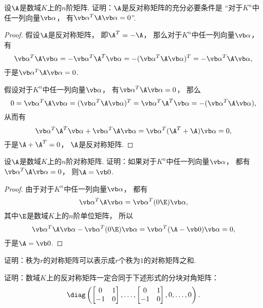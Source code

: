 \begin{example}\label{example:二次型.反对称矩阵对应的二次型恒为零}
设\(\A\)是数域\(K\)上的\(n\)阶矩阵.
证明：\(\A\)是反对称矩阵的充分必要条件是
“对于\(K^n\)中任一列向量\(\vb\alpha\)，
有\(\vb\alpha^T \A \vb\alpha = 0\)”.
\begin{proof}
假设\(\A\)是反对称矩阵，
即\(\A^T = -\A\)，
那么对于\(K^n\)中任一列向量\(\vb\alpha\)，
有\[
	\vb\alpha^T \A \vb\alpha
	= - \vb\alpha^T \A^T \vb\alpha
	= - (\vb\alpha^T \A \vb\alpha)^T
	= - \vb\alpha^T \A \vb\alpha, %
\]
于是\(\vb\alpha^T \A \vb\alpha = 0\).

假设对于\(K^n\)中任一列向量\(\vb\alpha\)，
有\(\vb\alpha^T \A \vb\alpha = 0\)，
那么\[
	0 = \vb\alpha^T \A \vb\alpha
	= (\vb\alpha^T \A \vb\alpha)^T
	= \vb\alpha^T \A^T \vb\alpha
	= - (\vb\alpha^T \A \vb\alpha),
\]
从而有\[
	\vb\alpha^T \A^T \vb\alpha
	+ \vb\alpha^T \A \vb\alpha
	= \vb\alpha^T (\A^T + \A) \vb\alpha
	= 0,
\]
于是\(\A + \A^T = 0\)，
\(\A\)是反对称矩阵.
\end{proof}
\end{example}
\begin{example}
设\(\A\)是数域\(K\)上的\(n\)阶对称矩阵.
证明：如果对于\(K^n\)中任一列向量\(\vb\alpha\)，
都有\(\vb\alpha^T \A \vb\alpha = 0\)，
则\(\A = \vb0\).
\begin{proof}
由于对于\(K^n\)中任一列向量\(\vb\alpha\)，
都有\[
	\vb\alpha^T \A \vb\alpha = \vb\alpha^T (0\E) \vb\alpha,
\]
其中\(\E\)是数域\(K\)上的\(n\)阶单位矩阵，
所以\[
	\vb\alpha^T \A \vb\alpha - \vb\alpha^T (0\E) \vb\alpha
	= \vb\alpha^T (\A - \vb0) \vb\alpha
	= 0,
\]
于是\(\A = \vb0\).
\end{proof}
\end{example}
\begin{example}
证明：秩为\(r\)的对称矩阵可以表示成\(r\)个秩为\(1\)的对称矩阵之和.
\end{example}
\begin{example}
证明：数域\(K\)上的反对称矩阵一定合同于下述形式的分块对角矩阵：\[
	\diag\left(
		\begin{bmatrix}
			0 & 1 \\
			-1 & 0
		\end{bmatrix},
		\dotsc,
		\begin{bmatrix}
			0 & 1 \\
			-1 & 0
		\end{bmatrix},
		0,\dotsc,0
	\right).
\]
\end{example}
